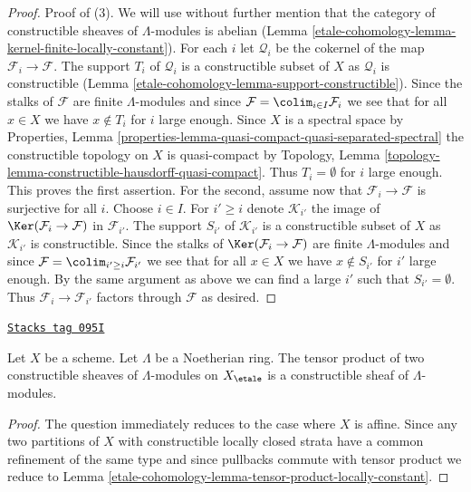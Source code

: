 \begin{proof}
\medskip\noindent
Proof of (3). We will use without further mention that the category of
constructible sheaves of $\Lambda$-modules is abelian
(Lemma \ref{etale-cohomology-lemma-kernel-finite-locally-constant}).
For each $i$ let $\mathcal{Q}_i$ be the cokernel of the map
$\mathcal{F}_i \to \mathcal{F}$. The support $T_i$ of $\mathcal{Q}_i$
is a constructible subset of $X$ as $\mathcal{Q}_i$ is constructible
(Lemma \ref{etale-cohomology-lemma-support-constructible}).
Since the stalks of $\mathcal{F}$ are finite $\Lambda$-modules
and since $\mathcal{F} = \colim_{i \in I} \mathcal{F}_i$ we see
that for all $x \in X$ we have $x \not \in T_i$ for $i$ large enough.
Since $X$ is a spectral space by Properties, Lemma
\ref{properties-lemma-quasi-compact-quasi-separated-spectral}
the constructible topology on $X$ is quasi-compact by
Topology, Lemma \ref{topology-lemma-constructible-hausdorff-quasi-compact}.
Thus $T_i = \emptyset$ for $i$ large enough. This proves the first
assertion. For the second, assume now that
$\mathcal{F}_i \to \mathcal{F}$ is surjective for all $i$.
Choose $i \in I$. For $i' \geq i$ denote $\mathcal{K}_{i'}$ the
image of $\Ker(\mathcal{F}_i \to \mathcal{F})$ in $\mathcal{F}_{i'}$.
The support $S_{i'}$ of $\mathcal{K}_{i'}$
is a constructible subset of $X$ as $\mathcal{K}_{i'}$ is constructible.
Since the stalks of $\Ker(\mathcal{F}_i \to \mathcal{F})$
are finite $\Lambda$-modules and since
$\mathcal{F} = \colim_{i' \geq i} \mathcal{F}_{i'}$ we see
that for all $x \in X$ we have $x \not \in S_{i'}$ for $i'$ large enough.
By the same argument as above we can find a large $i'$ such
that $S_{i'} = \emptyset$. Thus $\mathcal{F}_i \to \mathcal{F}_{i'}$
factors through $\mathcal{F}$ as desired.
\end{proof}

\begin{lemma}
\label{etale-cohomology-lemma-tensor-product-constructible}
\href{https://stacks.math.columbia.edu/tag/095I}{\texttt{Stacks tag 095I}}

Let $X$ be a scheme. Let $\Lambda$ be a Noetherian ring.
The tensor product of two constructible sheaves of $\Lambda$-modules
on $X_\etale$ is a constructible sheaf of $\Lambda$-modules.
\end{lemma}

\begin{proof}
The question immediately reduces to the case where $X$ is affine.
Since any two partitions of $X$ with constructible locally
closed strata have a common refinement of the same type and
since pullbacks commute with tensor product we reduce to
Lemma \ref{etale-cohomology-lemma-tensor-product-locally-constant}.
\end{proof}

